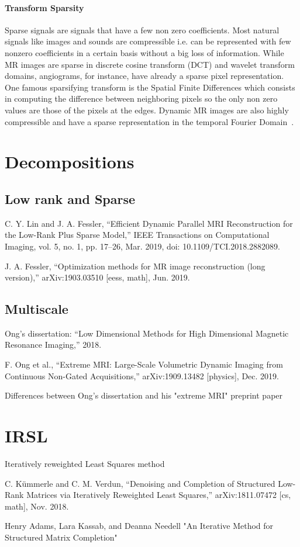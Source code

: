 \paragraph{Transform Sparsity}
 Sparse signals are signals that have a few non zero coefficients. Most natural signals like images and sounds are compressible i.e. can be represented with few nonzero coefficients in a certain basis without a big loss of information. While MR images are sparse in discrete cosine transform (DCT) and wavelet transform domains, angiograms, for instance, have already a sparse pixel representation.  One famous sparsifying transform is the Spatial Finite Differences which consists in computing the difference between neighboring pixels so the only non zero values are those of the pixels at the edges. Dynamic MR images are also highly compressible and have a sparse representation in the temporal Fourier Domain~\cite{parrish, lustig}.

\fi

\section{Decompositions}

\subsection{Low rank and Sparse}
C. Y. Lin and J. A. Fessler, “Efficient Dynamic Parallel MRI Reconstruction for the Low-Rank Plus Sparse Model,” IEEE Transactions on Computational Imaging, vol. 5, no. 1, pp. 17–26, Mar. 2019, doi: 10.1109/TCI.2018.2882089.

J. A. Fessler, “Optimization methods for MR image reconstruction (long version),” arXiv:1903.03510 [eess, math], Jun. 2019.

\subsection{Multiscale}

Ong's dissertation: “Low Dimensional Methods for High Dimensional Magnetic Resonance Imaging,” 2018.

F. Ong et al., “Extreme MRI: Large-Scale Volumetric Dynamic Imaging from Continuous Non-Gated Acquisitions,” arXiv:1909.13482 [physics], Dec. 2019.

Differences between Ong's dissertation and his "extreme MRI" preprint paper

\section{IRSL}
Iteratively reweighted Least Squares method

C. Kümmerle and C. M. Verdun, “Denoising and Completion of Structured Low-Rank Matrices via Iteratively Reweighted Least Squares,” arXiv:1811.07472 [cs, math], Nov. 2018.

Henry Adams, Lara Kassab, and Deanna Needell "An Iterative Method for Structured Matrix Completion"

\clearpage %